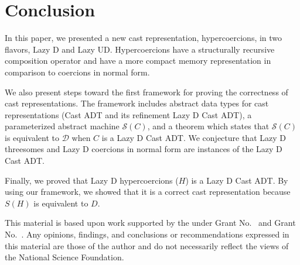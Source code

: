 \documentclass[acmsmall,review]{acmart}\settopmatter{printfolios=true,printccs=false,printacmref=false}
\newcommand{\ineffCEKD}{\ensuremath{\mathcal{D}}}
\newcommand{\effCEK}[1]{\ensuremath{\mathcal{S}(#1)}}
\begin{document}
\section{Conclusion} \label{sec:conclude}

In this paper, we presented a new cast representation, hypercoercions,
in two flavors, Lazy D and Lazy UD. Hypercoercions have a structurally
recursive composition operator and have a more compact memory
representation in comparison to coercions in normal form.

We also present steps toward the first framework for proving the
correctness of cast representations.
%
The framework includes abstract data types for cast representations
(Cast ADT and its refinement Lazy D Cast ADT), a parameterized abstract machine
\effCEK{C}, and a theorem which states that \effCEK{C} is equivalent
to $\ineffCEKD{}$ when $C$ is a Lazy D Cast ADT.
%
%
We conjecture that Lazy D
threesomes and Lazy D coercions in normal form are instances of the
Lazy D Cast ADT.

Finally, we proved that Lazy D hypercoercions ($H$) is a Lazy D Cast
ADT. By using our framework, we showed that it is a correct cast
representation because $S(H)$ is equivalent to $D$.

\begin{acks}                            %
  This material is based upon work supported by the
   under Grant
  No.~ and Grant
  No.~.  Any opinions, findings, and
  conclusions or recommendations expressed in this material are those
  of the author and do not necessarily reflect the views of the
  National Science Foundation.
\end{acks}






\end{document}

